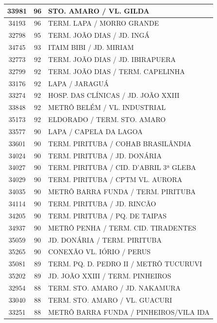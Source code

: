 \documentclass[
	12pt,				%
	oneside,			%
	a4paper,			%
	english,			%
	brazil				%
	]{abntex2ppgsi}
\begin{document}
\begin{apendicesenv}
\begin{longtable}{c|c|p{7cm}}
\hline
    33981 & 96    & STO. AMARO / VL. GILDA \\
\hline
    34193 & 96    & TERM. LAPA / MORRO GRANDE \\
\hline
    32798 & 95    & TERM. JOÃO DIAS / JD. INGÁ \\
\hline
    34745 & 93    & ITAIM BIBI / JD. MIRIAM \\
\hline
    32773 & 92    & TERM. JOÃO DIAS / JD. IBIRAPUERA \\
\hline
    32799 & 92    & TERM. JOÃO DIAS / TERM. CAPELINHA \\
\hline
    33176 & 92    & LAPA / JARAGUÁ \\
\hline
    33274 & 92    & HOSP. DAS CLÍNICAS / JD. JOÃO XXIII \\
\hline
    33848 & 92    & METRÔ BELÉM / VL. INDUSTRIAL \\
\hline
    35173 & 92    & ELDORADO / TERM. STO. AMARO \\
\hline
    33577 & 90    & LAPA / CAPELA DA LAGOA \\
\hline
    33601 & 90    & TERM. PIRITUBA / COHAB BRASILÂNDIA \\
\hline
    34024 & 90    & TERM. PIRITUBA / JD. DONÁRIA \\
\hline
    34027 & 90    & TERM. PIRITUBA / CID. D'ABRIL 3ª GLEBA \\
\hline
    34029 & 90    & TERM. PIRITUBA / CPTM VL. AURORA \\
\hline
    34035 & 90    & METRÔ BARRA FUNDA / TERM. PIRITUBA \\
\hline
    34114 & 90    & TERM. PIRITUBA / JD. RINCÃO \\
\hline
    34205 & 90    & TERM. PIRITUBA / PQ. DE TAIPAS \\
\hline
    34937 & 90    & METRÔ PENHA / TERM. CID. TIRADENTES \\
\hline
    35059 & 90    & JD. DONÁRIA / TERM. PIRITUBA \\
\hline
    35265 & 90    & CONEXÃO VL. IÓRIO / PERUS \\
\hline
    35081 & 89    & TERM. PQ. D. PEDRO II / METRÔ TUCURUVI \\
\hline
    35202 & 89    & JD. JOÃO XXIII / TERM. PINHEIROS \\
\hline
    32954 & 88    & TERM. STO. AMARO / JD. NAKAMURA \\
\hline
    33040 & 88    & TERM. STO. AMARO / VL. GUACURI \\
\hline
    33251 & 88    & METRÔ BARRA FUNDA / PINHEIROS/VILA IDA \\

\end{longtable}
\end{apendicesenv}
\end{document}
